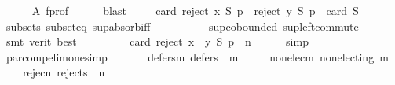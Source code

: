 \begin{isabellebody}
\ \ \ \ \isamarkupfalse%
\ A\ f{\isacharunderscore}{\kern0pt}prof\isanewline
\ \ \ \ \isamarkupfalse%
\ blast\isanewline
\ \ \isamarkupfalse%
\ {}{\isacharcolon}{\kern0pt}\ {\isachardoublequoteopen}card\ {\isacharparenleft}{\kern0pt}{\isacharparenleft}{\kern0pt}reject\ x\ S\ p{\isacharparenright}{\kern0pt}\ {\isasymunion}\ {\isacharparenleft}{\kern0pt}reject\ y\ S\ p{\isacharparenright}{\kern0pt}{\isacharparenright}{\kern0pt}\ {\isacharequal}{\kern0pt}\ card\ S{\isachardoublequoteclose}\isanewline
\ \ \ \ \isamarkupfalse%
\ subsets\ subset{\isacharunderscore}{\kern0pt}eq\ sup{\isachardot}{\kern0pt}absorb{\isacharunderscore}{\kern0pt}iff{}\isanewline
\ \ \ \ \ \ \ \ \ \ sup{\isachardot}{\kern0pt}cobounded{}\ sup{\isacharunderscore}{\kern0pt}left{\isacharunderscore}{\kern0pt}commute\isanewline
\ \ \ \ \isamarkupfalse%
\ {\isacharparenleft}{\kern0pt}smt\ {\isacharparenleft}{\kern0pt}verit{\isacharcomma}{\kern0pt}\ best{\isacharparenright}{\kern0pt}{\isacharparenright}{\kern0pt}\isanewline
\ \ \isamarkupfalse%
\ {}\ {}\isanewline
\ \ \isamarkupfalse%
\ {\isachardoublequoteopen}card\ {\isacharparenleft}{\kern0pt}reject\ {\isacharparenleft}{\kern0pt}x\ {\isasymparallel}\isactrlsub {\isasymup}\ y{\isacharparenright}{\kern0pt}\ S\ p{\isacharparenright}{\kern0pt}\ {\isacharequal}{\kern0pt}\ n{\isachardoublequoteclose}\isanewline
\ \ \ \ \isamarkupfalse%
\ simp\isanewline
{}\isamarkupfalse%
%
\endisatagproof
{\isafoldproof}%
%
\isadelimproof
\isanewline
%
\endisadelimproof
\isanewline
\isanewline
{}\isamarkupfalse%
\ par{\isacharunderscore}{\kern0pt}comp{\isacharunderscore}{\kern0pt}elim{\isacharunderscore}{\kern0pt}one{\isacharbrackleft}{\kern0pt}simp{\isacharbrackright}{\kern0pt}{\isacharcolon}{\kern0pt}\isanewline
\ \ \isanewline
\ \ \ \ defers{\isacharunderscore}{\kern0pt}m{\isacharunderscore}{\kern0pt}{}{\isacharcolon}{\kern0pt}\ {\isachardoublequoteopen}defers\ {}\ m{\isachardoublequoteclose}\ \isanewline
\ \ \ \ non{\isacharunderscore}{\kern0pt}elec{\isacharunderscore}{\kern0pt}m{\isacharcolon}{\kern0pt}\ {\isachardoublequoteopen}non{\isacharunderscore}{\kern0pt}electing\ m{\isachardoublequoteclose}\ \isanewline
\ \ \ \ rejec{\isacharunderscore}{\kern0pt}n{\isacharunderscore}{\kern0pt}{}{\isacharcolon}{\kern0pt}\ {\isachardoublequoteopen}rejects\ {}\ n{\isachardoublequoteclose}\ \isanewline

\end{isabellebody}
